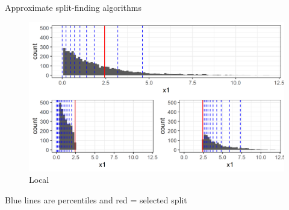\documentclass[11pt,compress,t,notes=noshow, xcolor=table]{beamer}
\begin{document}
\begin{vbframe}{Approximate split-finding algorithms}
\begin{small}
\begin{minipage}[b]{0.49\textwidth}
    \end{minipage}
    \begin{minipage}[b]{0.49\textwidth}
      \begin{figure}
        \includegraphics[width=\textwidth]{figure/split_finding_2.png}
        \caption*{Local}
      \end{figure}
    \end{minipage}
  \end{small}

  {\footnotesize
  Blue lines are percentiles and red = selected split}

  \framebreak


\end{vbframe}
\end{document}
